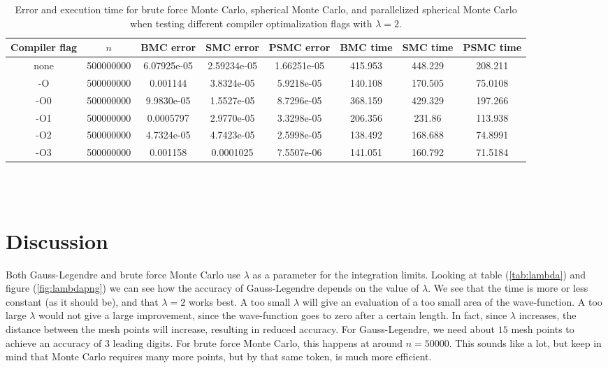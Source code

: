 \documentclass{article}
\begin{document}
  \begin{table}[ht]
    \centering
    \caption{Error and execution time for brute force Monte Carlo, spherical Monte Carlo, and parallelized spherical Monte Carlo when testing different compiler optimalization flags with $\lambda = 2$.}
    \vspace{2mm}
    \label{tab:optimalization-montecarlo}
    \begin{tabular}{|c|c|c|c|c|c|c|c|}
        \hline
        Compiler flag & $n$ & BMC error & SMC error & PSMC error & BMC time & SMC time & PSMC time  \\
        \hline \hline
        none & 500000000 & 6.07925e-05 & 2.59234e-05 & 1.66251e-05 & 415.953 & 448.229 & 208.211 \\
        -O & 500000000 & 0.001144 & 3.8324e-05 & 5.9218e-05 & 140.108 & 170.505 & 75.0108 \\
        -O0 & 500000000 & 9.9830e-05 & 1.5527e-05 & 8.7296e-05 & 368.159 & 429.329 & 197.266 \\
        -O1 & 500000000 & 0.0005797 & 2.9770e-05 & 3.3298e-05 & 206.356 & 231.86 & 113.938 \\
        -O2 & 500000000 & 4.7324e-05 & 4.7423e-05 & 2.5998e-05 & 138.492 & 168.688 & 74.8991 \\
        -O3 & 500000000 & 0.001158 & 0.0001025 & 7.5507e-06 & 141.051 & 160.792 & 71.5184 \\
        \hline
    \end{tabular} \\
    \hspace{0pt}\\
  \end{table}


\vspace{1cm}

\clearpage
\newpage

\section{Discussion} \label{sec:Discussion}

Both Gauss-Legendre and brute force Monte Carlo use $\lambda$ as a parameter for the integration limits. Looking at table (\ref{tab:lambda}) and figure (\ref{fig:lambdapng}) we can see how the accuracy of Gauss-Legendre depends on the value of $\lambda$. We see that the time is more or less constant (as it should be), and that $\lambda=2$ works best. A too small $\lambda$ will give an evaluation of a too small area of the wave-function. A too large $\lambda$ would not give a large improvement, since the wave-function goes to zero after a certain length. In fact, since $\lambda$ increases, the distance between the mesh points will increase, resulting in reduced accuracy.
For Gauss-Legendre, we need about $15$ mesh points to achieve an accuracy of 3 leading digits. For brute force Monte Carlo, this happens at around $n=50000$. This sounds like a lot, but keep in mind that Monte Carlo requires many more points, but by that same token, is much more efficient. \\
\end{document}
